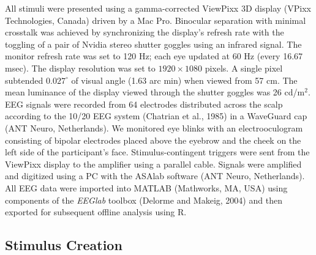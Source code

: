 \documentclass[
  12pt,
]{article}
\begin{document}
All stimuli were presented using a gamma-corrected ViewPixx 3D display
(VPixx Technologies, Canada) driven by a Mac Pro. Binocular separation
with minimal crosstalk was achieved by synchronizing the display's
refresh rate with the toggling of a pair of Nvidia stereo shutter
goggles using an infrared signal. The monitor refresh rate was set to
120 Hz; each eye updated at 60 Hz (every 16.67 msec). The display
resolution was set to \(1920 \times 1080\) pixels. A single pixel
subtended \(0.027^\circ\) of visual angle (1.63 arc min) when viewed
from 57 cm. The mean luminance of the display viewed through the shutter
goggles was 26 cd/m\(^2\). EEG signals were recorded from 64 electrodes
distributed across the scalp according to the 10/20 EEG system (Chatrian
et al., 1985) in a WaveGuard cap (ANT Neuro, Netherlands). We monitored
eye blinks with an electrooculogram consisting of bipolar electrodes
placed above the eyebrow and the cheek on the left side of the
participant's face. Stimulus-contingent triggers were sent from the
ViewPixx display to the amplifier using a parallel cable. Signals were
amplified and digitized using a PC with the ASAlab software (ANT Neuro,
Netherlands). All EEG data were imported into MATLAB (Mathworks, MA,
USA) using components of the \textit{EEGlab} toolbox (Delorme and
Makeig, 2004) and then exported for subsequent offline analysis using R.

\subsection{Stimulus Creation}\label{stimulus-creation}
\end{document}
